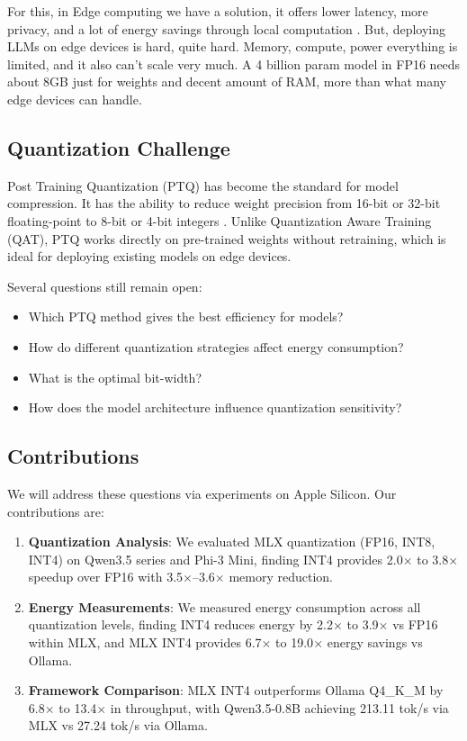\documentclass[conference]{IEEEtran}
\begin{document}
For this, in Edge computing we have a solution, it offers lower latency, more privacy, and a lot of energy savings through local computation \cite{shi2016edge}. But, deploying LLMs on edge devices is hard, quite hard. Memory, compute, power everything is limited, and it also can't scale very much. A 4 billion param model in FP16 needs about 8GB just for weights and decent amount of RAM, more than what many edge devices can handle.

\subsection{Quantization Challenge}

Post Training Quantization (PTQ) has become the standard for model compression. It has the ability to reduce weight precision from 16-bit or 32-bit floating-point to 8-bit or 4-bit integers \cite{han2015deep}. Unlike Quantization Aware Training (QAT), PTQ works directly on pre-trained weights without retraining, which is ideal for deploying existing models on edge devices.

Several questions still remain open:

\begin{itemize}[leftmargin=*,nosep]
    \item Which PTQ method gives the best efficiency for models?
    \item How do different quantization strategies affect energy consumption?
    \item What is the optimal bit-width?
    \item How does the model architecture influence quantization sensitivity?
\end{itemize}

\subsection{Contributions}

We will address these questions via experiments on Apple Silicon. Our contributions are:

\begin{enumerate}[leftmargin=*,nosep]
    \item \textbf{Quantization Analysis}: We evaluated MLX quantization (FP16, INT8, INT4) on Qwen3.5 series and Phi-3 Mini, finding INT4 provides 2.0$\times$ to 3.8$\times$ speedup over FP16 with 3.5$\times$--3.6$\times$ memory reduction.

    \item \textbf{Energy Measurements}: We measured energy consumption across all quantization levels, finding INT4 reduces energy by 2.2$\times$ to 3.9$\times$ vs FP16 within MLX, and MLX INT4 provides 6.7$\times$ to 19.0$\times$ energy savings vs Ollama.

    \item \textbf{Framework Comparison}: MLX INT4 outperforms Ollama Q4\_K\_M by 6.8$\times$ to 13.4$\times$ in throughput, with Qwen3.5-0.8B achieving 213.11 tok/s via MLX vs 27.24 tok/s via Ollama.
\end{enumerate}
\end{document}
